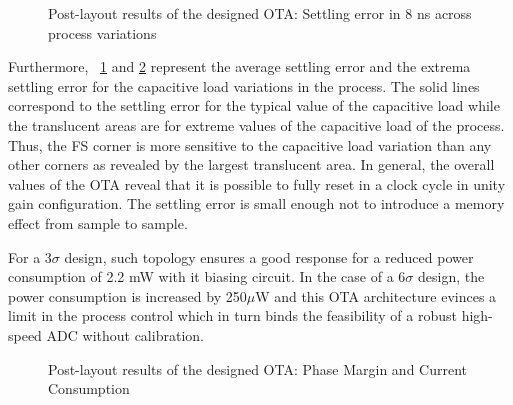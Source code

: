 \begin{figure}[htp]
    \centering
    \begin{subfigure}[b]{0.48\textwidth}
        \resizebox{\textwidth}{!}{
            
        }
        \label{fig:ota_error_400fF_temp_corners}
    \end{subfigure}
    \begin{subfigure}[b]{0.48\textwidth}
        \resizebox{\textwidth}{!}{
            
        }
        \label{fig:ota_error_1pF_temp_corners}
    \end{subfigure}
    \caption{Post-layout results of the designed OTA: Settling error in 8 ns across process variations}
    \label{fig:ota_result-2}
\end{figure}

Furthermore, \figurename~\ref{fig:ota_error_400fF_temp_corners} and \ref{fig:ota_error_1pF_temp_corners} represent the average settling error and the extrema settling error for the capacitive load variations in the process. The solid lines correspond to the settling error for the typical value of the capacitive load while the translucent areas are for extreme values of the capacitive load of the process. Thus, the FS corner is more sensitive to the capacitive load variation than any other corners as revealed by the largest translucent area. In general, the overall values of the OTA reveal that it is possible to fully reset in a clock cycle in unity gain configuration. The settling error is small enough not to introduce a memory effect from sample to sample.

For a \(3\sigma \) design, such topology ensures a good response for a reduced power consumption of 2.2 mW with it biasing circuit. In the case of a \(6\sigma \) design, the power consumption is increased by 250\(\mu \)W and this OTA architecture evinces a limit in the process control which in turn binds the feasibility of a robust high-speed ADC without calibration.

\begin{figure}[htp]
    \centering
    \begin{subfigure}[b]{0.48\textwidth}
        \resizebox{\textwidth}{!}{
            
        }
        \label{fig:ota_pm_temp_corners}
    \end{subfigure}
    \begin{subfigure}[b]{0.48\textwidth}
        \resizebox{\textwidth}{!}{
            
        }
        \label{fig:ota_pow_temp_corners}
    \end{subfigure}
    \caption{Post-layout results of the designed OTA: Phase Margin and Current Consumption}
    \label{fig:ota_result-3}
\end{figure}

